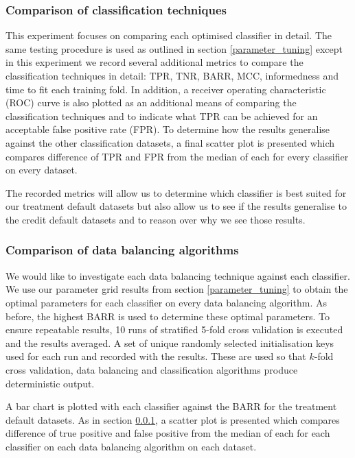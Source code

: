 \documentclass{sig-alternate-05-2015}
\begin{document}
	\subsubsection{Comparison of classification techniques}
	\label{comparision_of_classification_technique}
	This experiment focuses on comparing each optimised classifier in detail. The same testing procedure is used as outlined in section \ref{parameter_tuning} except in this experiment we record several additional metrics to compare the classification techniques in detail: TPR, TNR, BARR, MCC, informedness and time to fit each training fold. In addition, a receiver operating characteristic (ROC) curve is also plotted as an additional means of comparing the classification techniques and to indicate what TPR can be achieved for an acceptable false positive rate (FPR). To determine how the results generalise against the other classification datasets, a final scatter plot is presented which compares difference of TPR and FPR from the median of each for every classifier on every dataset.
	
	The recorded metrics will allow us to determine which classifier is best suited for our treatment default datasets but also allow us to see if the results generalise to the credit default datasets and to reason over why we see those results.
	
	\subsubsection{Comparison of data balancing algorithms}
	We would like to investigate each data balancing technique against each classifier. We use our parameter grid results from section \ref{parameter_tuning} to obtain the optimal parameters for each classifier on every data balancing algorithm. As before, the highest BARR is used to determine these optimal parameters. To ensure repeatable results, 10 runs of stratified 5-fold cross validation is executed and the results averaged. A set of unique randomly selected initialisation keys used for each run and recorded with the results. These are used so that $k$-fold cross validation, data balancing and classification algorithms produce deterministic output.
	
	A bar chart is plotted with each classifier against the BARR for the treatment default datasets. As in section \ref{comparision_of_classification_technique}, a scatter plot is presented which compares difference of true positive and false positive from the median of each for each classifier on each data balancing algorithm on each dataset. 
	
\end{document}
